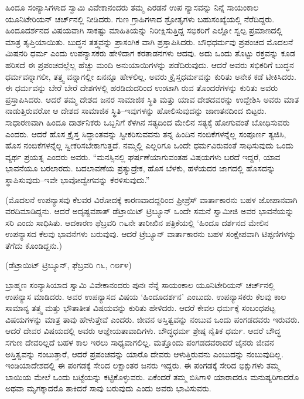 ಹಿಂದೂ ಸಂನ್ಯಾಸಿಗಳಾದ ಸ್ವಾಮಿ ವಿವೇಕಾನಂದರು ತಮ್ಮ ಎರಡನೆ ಉಪ ನ್ಯಾಸವನ್ನು ನಿನ್ನೆ ಸಾಯಂಕಾಲ ಯೂನಿಟೇರಿಯನ್​ ಚರ್ಚ್​ನಲ್ಲಿ ನೀಡಿದರು. ಗುಣ ಗ್ರಾಹಿಗಳಾದ ಶ್ರೋತೃಗಳು ಬಹುಸಂಖ್ಯೆಯಲ್ಲಿ ನೆರೆದಿದ್ದರು. ಹಿಂದೂದರ್ಶನದ ವಿಷಯವಾಗಿ ಸಾಕಷ್ಟು ಮಾಹಿತಿಯನ್ನು ನಿರೀಕ್ಷಿಸುತ್ತಿದ್ದ ಸಭಿಕರಿಗೆ ಎಲ್ಲೋ ಸ್ವಲ್ಪ ಪ್ರಮಾಣದಲ್ಲಿ ಮಾತ್ರ ತೃಪ್ತಿಯಾಯಿತು. ಬುದ್ಧನ ತತ್ತ್ವವನ್ನು ಪ್ರಾಸಂಗಿಕ ವಾಗಿ ಪ್ರಸ್ತಾಪಿಸಿದರು. ಬೌಧಧರ್ಮವು ಪ್ರಪಂಚದ ಮೊದಲನೆ ಮಿಷನರಿ ಧರ್ಮ ಎಂದು ಉಪನ್ಯಾಸಕರು ಹೇಳಿದಾಗ ಕರತಾಡನಗಳು ಆದವು. ಅದು ಒಂದು ತೊಟ್ಟು ರಕ್ತವನ್ನು ಕೂಡ ಹರಿಸದೆ ಈ ಪ್ರಪಂಚದಲ್ಲೆಲ್ಲ ಹೆಚ್ಚು ಮಂದಿ ಅನುಯಾಯಿಗಳನ್ನು ಪಡೆದಿರುವುದು. ಆದರೆ ಅವರು ಸಭಿಕರಿಗೆ ಬುದ್ಧನ ಧರ್ಮವನ್ನಾಗಲೀ, ತತ್ತ್ವ ವನ್ನಾಗಲ್ಲೀ ಏನನ್ನೂ ಹೇಳಲಿಲ್ಲ. ಅವರು ಕ್ರೈಸ್ತಧರ್ಮವನ್ನು ಕುರಿತು ಅನೇಕ ಕಡೆ ಟೀಕಿಸಿದರು. ಈ ಧರ್ಮವನ್ನು ಬೇರೆ ಬೇರೆ ದೇಶಗಳಲ್ಲಿ ಹರಡಿದುದರಿಂದ ಉಂಟಾಗಿ ರುವ ತೊಂದರೆಗಳನ್ನು ಕುರಿತು ಅವರು ಪ್ರಸ್ತಾಪಿಸಿದರು. ಆದರೆ ತಮ್ಮ ದೇಶದ ಜನರ ಸಾಮಾಜಿಕ ಸ್ಥಿತಿ ಮತ್ತು ಯಾವ ದೇಶದವರನ್ನು ಉದ್ದೇಶಿಸಿ ಅವರು ಮಾತ ನಾಡುತ್ತಿರುವರೋ ಆ ದೇಶದ ಸಾಮಾಜಿಕ ಸ್ಥಿತಿ–ಇವುಗಳನ್ನು ಹೋಲಿಸುವುದನ್ನು ಜಾಣತನದಿಂದ ಬಿಟ್ಟರು. ಸಾಧಾರಣವಾಗಿ ಹಿಂದೂ ದಾರ್ಶನಿಕರು ಒಬ್ಬನಿಗೆ ಕೆಳಗಿನ ಸತ್ಯದಿಂದ ಮೇಲಿನ ಸತ್ಯಕ್ಕೆ ಹೋಗುವಂತೆ ಬೋಧಿಸುವರು ಎಂದರು. ಆದರೆ ಹೊಸ ಕ್ರೈಸ್ತ ಸಿದ್ಧಾಂತವನ್ನು ಸ್ವೀಕರಿಸುವವನು ತನ್ನ ಹಿಂದಿನ ನಂಬಿಕೆಗಳನ್ನೆಲ್ಲ ಸಂಪೂರ್ಣ ತ್ಯಜಿಸಿ, ಹೊಸ ನಂಬಿಕೆಗಳನ್ನೆಲ್ಲ ಸ್ವೀಕರಿಸಬೇಕಾಗುತ್ತದೆ. ನಮ್ಮಲ್ಲಿ ಎಲ್ಲರಿಗೂ ಒಂದೇ ಧರ್ಮವಿರುವಂತೆ ಸಾಧಿಸುವುದು ಒಂದು ವ್ಯರ್ಥ ಪ್ರಯತ್ನ ಎಂದರು ಅವರು. “ಮನಸ್ಸಿನಲ್ಲಿ ಘರ್ಷಣೆಯಾಗುವಂತಹ ವಿಷಯಗಳು ಬರದೆ ಇದ್ದರೆ, ಯಾವ ಭಾವನೆಯೂ ಬರಲಾರದು. ಬದಲಾವಣೆಯ ಪ್ರತ್ಯುದ್ರೇಕ, ಹೊಸ ಬೆಳಕು, ಹಳೆಯದರ ಜಾಗದಲ್ಲಿ ಹೊಸದನ್ನು ಸ್ಥಾಪಿಸುವುದು–ಇವೇ ಭಾವೋದ್ವೇಗವನ್ನು ಕೆರಳಿಸುವುದು.”

\begin{center}
(ಮೊದಲನೆ ಉಪನ್ಯಾಸವು ಕೆಲವರ ವಿರೋದಕ್ಕೆ ಕಾರಣವಾದದ್ದರಿಂದ ಫ್ರೀಪ್ರೆಸ್​ ವಾರ್ತಾಕಾರನು ಬಹಳ ಜೋಪಾನವಾಗಿ ವರದಿಮಾಡಿದ್ದನು. ಆದರೆ ಅದೃಷ್ಟವಶಾತ್​ ಡೆಟ್ರಾಯಿಟ್​ ಟ್ರಿಬ್ಯೂನ್​ ಒಂದೇ ಸಮನೆ ಸ್ವಾಮೀಜಿ ಅವರ ಭಾವನೆಯನ್ನು ಸರಿ ಎಂದು ಸಾಧಿಸಿತು. ಆದಕಾರಣ ಫೆಬ್ರವರಿ ೧೬ನೇ ತಾರೀಖಿನ ಪತ್ರಿಕೆಯಲ್ಲಿ ‘ಹಿಂದೂ ದರ್ಶನದ ಮೇಲಿನ ಉಪನ್ಯಾಸದ ಕೆಲವು ಭಾವನೆಗಳು ಬರುವುವು. ಆದರೆ ಟ್ರೆಬ್ಯೂನ್​ ವಾರ್ತಾಕಾರನು ಬಹಳ ಸಂಕ್ಷೇಪವಾಗಿ ಟಿಪ್ಪಣಿಗಳನ್ನು ತೆಗೆದು ಕೊಂಡಿದ್ದನು.)
\end{center}

\begin{center}
(ಡೆಟ್ರಾಯಿಟ್​ ಟ್ರಿಬ್ಯೂನ್​, ಫೆಬ್ರವರಿ ೧೬, ೧೮೯೪)
\end{center}

ಬ್ರಾಹ್ಮಣ ಸಂನ್ಯಾಸಿಯಾದ ಸ್ವಾಮಿ ವಿವೇಕಾನಂದರು ಪುನಃ ನೆನ್ನೆ ಸಾಯಂಕಾಲ ಯೂನಿಟೇರಿಯನ್​ ಚರ್ಚ್​ನಲ್ಲಿ ಉಪನ್ಯಾಸ ಮಾಡಿದರು. ಅವರ ಉಪನ್ಯಾಸದ ವಿಷಯ ‘ಹಿಂದೂದರ್ಶನ’ ಎಂಬುದು. ಉಪನ್ಯಾಸಕರು ಕೆಲವು ಕಾಲ ಸಾಮಾನ್ಯ ತತ್ತ್ವ ಮತ್ತು ಭೌತಾತೀತ ವಿಷಯವನ್ನು ಕುರಿತು ಹೇಳಿದರು. ಆದರೆ ಕೇವಲ ಧರ್ಮಕ್ಕೆ ಸಂಬಂಧಪಟ್ಟ ವಿಷಯಗಳನ್ನು ಮಾತ್ರ ತಾವು ಹೇಳುತ್ತೇವೆ ಎಂದರು. ಜೀವನ ಅಸ್ತಿತ್ವವನ್ನು ನಂಬುವ ಒಂದು ಪಂಗಡದವರು ಇರುವರು. ಆದರೆ ದೇವರ ವಿಷಯದಲ್ಲಿ ಅವರು ಆಜ್ಞೇಯತಾವಾದಿಗಳು. ಬೌದ್ಧಧರ್ಮ ಶ್ರೇಷ್ಠ ನೈತಿಕ ಧರ್ಮ. ಆದರೆ ಬೌದ್ಧ ಸಗುಣ ದೇವರಿಲ್ಲದೆ ಬಹಳ ಕಾಲ ಇರಲು ಸಾಧ್ಯವಾಗಲಿಲ್ಲ. ಮತ್ತೊಂದು ಪಂಗಡದವರಾದರೆ ಜೈನರು ಜೀವನ ಅಸ್ತಿತ್ವವನ್ನು ನಂಬುತ್ತಾರೆ, ಆದರೆ ಪ್ರಪಂಚವನ್ನು ಯಾರೊ ದೇವರು ಆಳುತ್ತಿರುವನು ಎಂಬುದನ್ನು ನಂಬುವುದಿಲ್ಲ. ಇಂಡಿಯಾದೇಶದಲ್ಲಿ ಈ ಪಂಗಡಕ್ಕೆ ಸೇರಿದ ಲಕ್ಷಾಂತರ ಜನರು ಇದ್ದರು. ಈ ಪಂಗಡಕ್ಕೆ ಸೇರಿದ ಭಿಕ್ಷುಗಳು ತಮ್ಮ ಬಾಯಿಯ ಮೇಲೆ ಒಂದು ಬಟ್ಟೆಯನ್ನು ಕಟ್ಟಿಕೊಳ್ಳುವರು. ಏಕೆಂದರೆ ತಮ್ಮ ಬಿಸಿಗಾಳಿ ಯಾರಾದರೂ ಮನುಷ್ಯರಿಗಾದರೊ ಅಥವಾ ಮೃಗಕ್ಕಾದರೊ ತಾಕಿದರೆ ಸಾವು ಬರುವುದು ಎಂದು ಅವರು ಭಾವಿಸುವರು.

